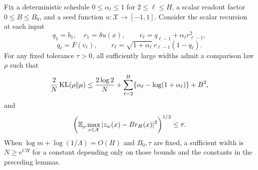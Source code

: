 \begin{lemma}
\label{lem:spike-finite-width}
Fix a deterministic schedule $0\le\alpha_\ell\le1$ for $2\le\ell\le H$, a scalar readout factor $0\le B\le B_0$, and a seed function $u:\mathcal X\to[-1,1]$. Consider the scalar recursion at each input
\[
 q_1=b_1,\quad r_1=\delta u(x),\qquad
 v_\ell=q_{\ell-1}+\alpha_\ell r_{\ell-1}^2,
\]
\[
 q_\ell=F(v_\ell),\qquad
 r_\ell=\sqrt{1+\alpha_\ell}\,r_{\ell-1}(1-q_\ell).
\]
For any fixed tolerance $\tau>0$, all sufficiently large widths admit a comparison law $\rho$ such that
\begin{equation}
 \frac2N\operatorname{KL}(\rho\|\mu)
 \le\frac{2\log2}N+
      \sum_{\ell=2}^H\{\alpha_\ell-\log(1+\alpha_\ell)\}+B^2,
 \label{eq:spike-exact-entropy}
\end{equation}
and
\[
 \left(\mathbb E_\rho\max_{x\in\mathcal X}|z_w(x)-B r_H(x)|^2\right)^{1/2}\le\tau.
\]
When $\log m+\log(1/\Lambda)=O(H)$ and $B_0,\tau$ are fixed, a sufficient width is $N\ge e^{CH}$ for a constant depending only on those bounds and the constants in the preceding lemmas.
\end{lemma}
